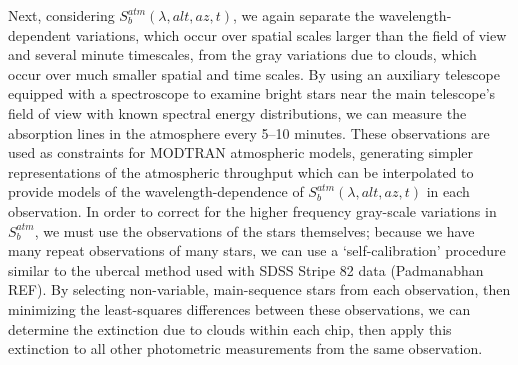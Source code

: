 \documentclass[12pt,preprint]{aastex}
\begin{document}
Next, considering $S_b^{atm}(\lambda,alt,az,t)$, we again
separate the wavelength-dependent variations, which occur over
spatial scales larger than the field of view and several minute timescales, from the gray
variations due to clouds, which occur over much smaller spatial and
time scales. By using an auxiliary telescope equipped with a
spectroscope to examine bright stars near the main telescope's field
of view with known spectral energy
distributions, we can measure the absorption lines in
the atmosphere every 5--10 minutes. These observations are used as
constraints for MODTRAN atmospheric models, generating simpler
representations of the atmospheric throughput which can be
interpolated to provide models of the wavelength-dependence of
$S_b^{atm}(\lambda,alt,az,t)$ in each observation. In order to correct
for the higher frequency gray-scale variations in $S_b^{atm}$, we must
use the observations of the stars themselves; because we have many repeat
observations of many stars, we can use a `self-calibration' procedure
similar to the ubercal method used with SDSS Stripe 82 data
(Padmanabhan REF). By selecting non-variable, main-sequence stars
from each observation, then minimizing the least-squares differences
between these observations, we can determine the extinction due to
clouds within each chip, then apply this extinction to all other
photometric measurements from the same observation. 
\end{document}
